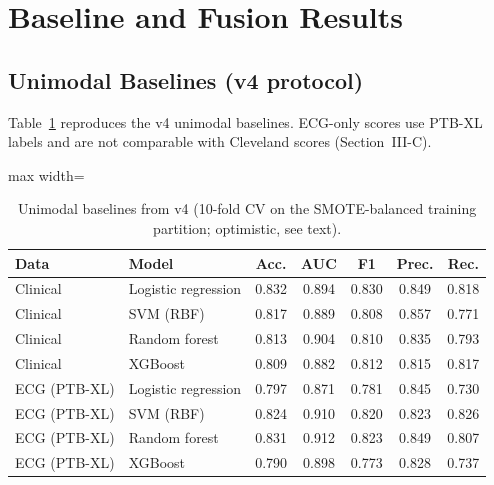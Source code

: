 \section{Baseline and Fusion Results}
\subsection{Unimodal Baselines (v4 protocol)}
Table~\ref{tab:unimodal} reproduces the v4 unimodal baselines.  ECG-only scores use PTB-XL labels and are not comparable with Cleveland scores (Section~III-C).

\begin{table}[!t]
\centering\scriptsize
\caption{Unimodal baselines from v4 (10-fold CV on the SMOTE-balanced training partition; optimistic, see text).}
\label{tab:unimodal}
\setlength{\tabcolsep}{2.5pt}
\begin{adjustbox}{max width=\linewidth}
\begin{tabular}{llccccc}
\toprule
Data & Model & Acc. & AUC & F1 & Prec. & Rec.\\
\midrule
Clinical & Logistic regression & 0.832 & 0.894 & 0.830 & 0.849 & 0.818\\
Clinical & SVM (RBF) & 0.817 & 0.889 & 0.808 & 0.857 & 0.771\\
Clinical & Random forest & 0.813 & 0.904 & 0.810 & 0.835 & 0.793\\
Clinical & XGBoost & 0.809 & 0.882 & 0.812 & 0.815 & 0.817\\
\midrule
ECG (PTB-XL) & Logistic regression & 0.797 & 0.871 & 0.781 & 0.845 & 0.730\\
ECG (PTB-XL) & SVM (RBF) & 0.824 & 0.910 & 0.820 & 0.823 & 0.826\\
ECG (PTB-XL) & Random forest & 0.831 & 0.912 & 0.823 & 0.849 & 0.807\\
ECG (PTB-XL) & XGBoost & 0.790 & 0.898 & 0.773 & 0.828 & 0.737\\
\bottomrule
\end{tabular}
\end{adjustbox}
\end{table}

